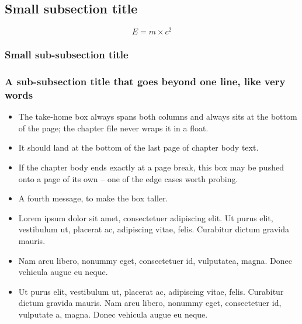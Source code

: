 \subsection{Small subsection title}

\lipsum[3-4]

\begin{equation}
    E = m \times c^2
\end{equation}

\subsubsection{Small sub-subsection title}

\lipsum[4-5]

\subsubsection{A sub-subsection title that goes beyond one line, like very  words}

\lipsum[6-7]


\lipsum[3-4]

\begin{boxmessages}
\begin{itemize}
\item The take-home box always spans both columns and always sits at the bottom of the page; the chapter file never wraps it in a float.
\item It should land at the bottom of the last page of chapter body text.
\item If the chapter body ends exactly at a page break, this box may be pushed onto a page of its own -- one of the edge cases worth probing.
\item A fourth message, to make the box taller.
\item Lorem ipsum dolor sit amet, consectetuer adipiscing elit. Ut purus elit, vestibulum ut, placerat ac, adipiscing vitae, felis. Curabitur dictum gravida mauris.
\item Nam arcu libero, nonummy eget, consectetuer id, vulputatea, magna. Donec vehicula augue eu neque.
\item Ut purus elit, vestibulum ut, placerat ac, adipiscing vitae, felis. Curabitur dictum gravida mauris. Nam arcu libero, nonummy eget, consectetuer id, vulputate a, magna. Donec vehicula augue eu neque.
\end{itemize}
\end{boxmessages}

